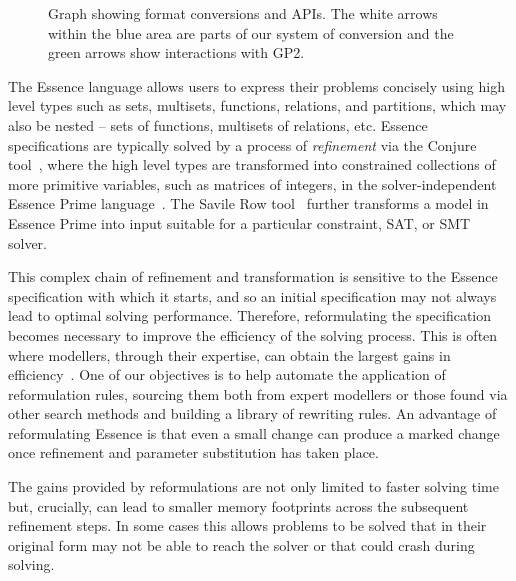 \documentclass[anonymous,a4paper,UKenglish,cleveref,pdfa]{lipics-v2021}
\newcommand{\essence}{\textsc{Essence}\xspace}
\newcommand{\eprime}{\textsc{Essence Prime}\xspace}
\newcommand{\conjure}{\textsc{Conjure}\xspace}
\newcommand{\savilerow}{\textsc{Savile Row}\xspace}
\begin{document}
\begin{figure}[htbp]
\centering
  
  \caption{Graph showing format conversions and APIs. The white arrows within the blue area are parts of our system of conversion and the green arrows show interactions with GP2.}
  \label{fig:formats_graph}
\end{figure}

The {\sc Essence} language allows users to express their problems concisely using high level types such as sets, multisets, functions, relations, and partitions, which may also be nested -- sets of functions, multisets of relations, etc. {\sc Essence} specifications are typically solved by a process of {\em refinement} via the {\sc Conjure} tool~\cite{Akgun2022:Conjure}, where the high level types are transformed into constrained collections of more primitive variables, such as matrices of integers, in the solver-independent {\sc Essence Prime} language~\cite{nightingale2016essence}. The {\sc Savile Row} tool~\cite{savilerow} further transforms a model in {\sc Essence Prime} into input suitable for a particular constraint, SAT, or SMT solver.

This complex chain of refinement and transformation is sensitive to the {\sc Essence} specification with which it starts, and so an  initial specification may not always lead to optimal solving performance. Therefore, reformulating the specification becomes necessary to improve the efficiency of the solving process. This is often where modellers, through their expertise, can obtain the largest gains in efficiency~\cite{Regin2013:ACP}. One of our objectives is to help automate the application of reformulation rules, sourcing them both from expert modellers or those found via other search methods and building a library of rewriting rules. An advantage of reformulating {\sc Essence} is that even a small change can produce a marked change once refinement and parameter substitution has taken place.


The gains provided by reformulations are not only limited to faster solving time but, crucially, can lead to smaller memory footprints across the subsequent refinement steps. In some cases this allows problems to be solved that in their original form may not be able to reach the solver or that could crash during solving.
\end{document}
